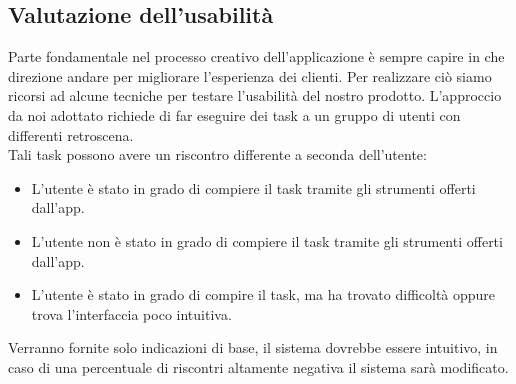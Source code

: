 \documentclass{natourDoc}
\begin{document}
\subsection{Valutazione dell'usabilità}
Parte fondamentale nel processo creativo dell’applicazione è sempre capire in che direzione andare per migliorare l’esperienza dei clienti.
Per realizzare ciò siamo ricorsi ad alcune tecniche per testare l’usabilità del nostro prodotto.
L’approccio da noi adottato richiede di far eseguire dei task a un gruppo di utenti con differenti retroscena. \\

Tali task possono avere un riscontro differente a seconda dell'utente:
\begin{itemize}
	\item L’utente è stato in grado di compiere il task tramite gli strumenti offerti dall’app.
	\item L’utente non è stato in grado di compiere il task tramite gli strumenti offerti dall’app.
	\item L'utente è stato in grado di compire il task, ma ha trovato difficoltà oppure trova l'interfaccia poco intuitiva.
\end{itemize}

Verranno fornite solo indicazioni di base, il sistema dovrebbe essere intuitivo, in caso di una percentuale di riscontri altamente
negativa il sistema sarà modificato.
\end{document}
